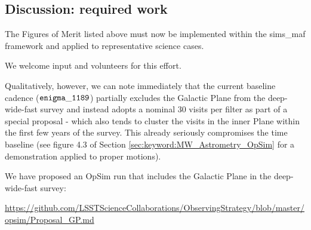 





\subsection{Discussion: required work}
\label{sec:keyword:MW_Disk_discussion}

The Figures of Merit listed above must now be implemented within the
sims\_maf framework and applied to representative science cases.

We welcome input and volunteers for this effort. 

Qualitatively, however, we can note immediately that the current
baseline cadence (${\tt enigma\_1189}$) partially excludes the
Galactic Plane from the deep-wide-fast survey and instead adopts a
nominal 30 visits per filter as part of a special proposal - which
also tends to cluster the visits in the inner Plane within the first
few years of the survey. This already seriously compromises the time
baseline (see figure 4.3 of Section
\ref{sec:keyword:MW_Astrometry_OpSim} for a demonstration applied to
proper motions).

We have proposed an OpSim run that includes the Galactic Plane in the
deep-wide-fast survey:

\url{https://github.com/LSSTScienceCollaborations/ObservingStrategy/blob/master/opsim/Proposal_GP.md}






\navigationbar
